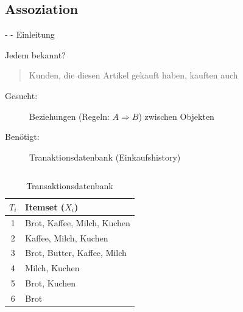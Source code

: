 \documentclass[fleqn,11pt,aspectratio=43]{beamer}
\begin{document}
%
%

\subsection{Assoziation~}


\begin{frame}{\insertsectionhead - \insertsubsectionhead - Einleitung \cite{ester2000knowledge}}

\begin{alertblock}{Jedem bekannt?}
\begin{quote}
Kunden, die diesen Artikel gekauft haben, kauften auch
\end{quote}
\end{alertblock}
\pause
\begin{description}
\item[Gesucht:] Beziehungen (Regeln: $A \Rightarrow B$) zwischen Objekten
\item[Benötigt:] Tranaktionsdatenbank (Einkaufshistory)
\end{description}
\pause
\begin{columns}[onlytextwidth]
 \small
    \begin{table}
    	    \hspace{-2em}\begin{tabular}{c|l}
    	    $T_i$ & Itemset ($X_i$)\\ \hline
    	    1 & Brot, Kaffee, Milch, Kuchen\\
    	    2 & Kaffee, Milch, Kuchen\\
    	    3 & Brot, Butter, Kaffee, Milch\\
    	    4 & Milch, Kuchen\\
    	    5 & Brot, Kuchen\\
    	    6 & Brot
    	    \end{tabular}
    	    \caption{\footnotesize Transaktionsdatenbank \cite{ester2000knowledge}}
    	    \end{table}
    	    

\end{columns}
\end{frame}
\end{document}
